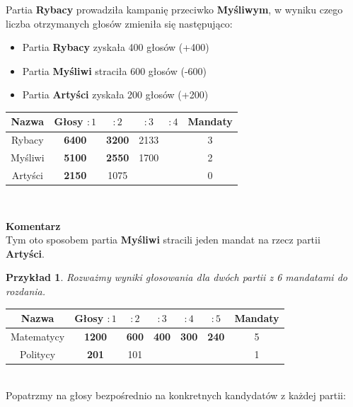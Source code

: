 \documentclass[12pt,a4paper]{article}
\theoremstyle{break}
\newcommand{\Komentarz}[1]{
	\begin{mdframed}[style=zadanie]
		\textbf{Komentarz}\\
		#1
	\end{mdframed}
	}
\newtheorem{example}{Przykład}[section]
\begin{document}
Partia \textbf{Rybacy} prowadziła kampanię przeciwko \textbf{Myśliwym}, w wyniku czego liczba otrzymanych głosów zmieniła się następująco:
\begin{itemize}
	\item Partia \textbf{Rybacy} zyskała 400 głosów (+400)
	\item Partia \textbf{Myśliwi} straciła 600 głosów (-600)
	\item Partia \textbf{Artyści} zyskała 200 głosów (+200)
\end{itemize}

\begin{tabular}{|c|c|c|c|c|c|}\hline
	Nazwa    & Głosy $:1$ & $:2$ & $:3$ & $:4$ & Mandaty\\\hline
	Rybacy   & \textbf{6400} & \textbf{3200} & 2133 &       & 3\\\hline
	Myśliwi  & \textbf{5100} & \textbf{2550} & 1700 &       & 2\\\hline
	Artyści  & \textbf{2150} & 1075          &      &       & 0\\\hline
\end{tabular}\\

\Komentarz{Tym oto sposobem partia \textbf{Myśliwi} stracili jeden mandat na rzecz partii \textbf{Artyści}.}

\begin{example}
	Rozważmy wyniki głosowania dla dwóch partii z 6 mandatami do rozdania.
\end{example}

\begin{tabular}{|c|c|c|c|c|c|c|}\hline
	Nazwa        & Głosy $:1$ & $:2$ & $:3$ & $:4$ & $:5$ & Mandaty\\\hline
	Matematycy   & \textbf{1200} & \textbf{600} & \textbf{400} & \textbf{300} & \textbf{240} & 5\\\hline
	Politycy     & \textbf{201}  & 101         &       &       &       & 1\\\hline
\end{tabular}\\

Popatrzmy na głosy bezpośrednio na konkretnych kandydatów z każdej partii:
\end{document}
